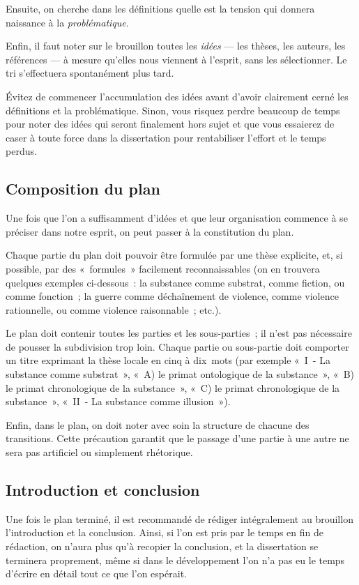 \documentclass[a4paper]{article}
\begin{document}
Ensuite, on cherche dans les définitions quelle est la tension qui
donnera naissance à la \emph{problématique}.

Enfin, il faut noter sur le brouillon toutes les \emph{idées} --- les thèses,
les auteurs, les références --- à mesure qu'elles nous viennent à
l'esprit, sans les sélectionner. Le tri s'effectuera spontanément plus
tard.

Évitez de commencer l'accumulation des idées avant d'avoir clairement
cerné les définitions et la problématique. Sinon, vous risquez perdre
beaucoup de temps pour noter des idées qui seront finalement hors sujet
et que vous essaierez de caser à toute force dans la dissertation pour
rentabiliser l'effort et le temps perdus.
\subsection{Composition du plan}
\label{sec-1-3}


Une fois que l'on a suffisamment d'idées et que leur organisation
commence à se préciser dans notre esprit, on peut passer à la
constitution du plan.

Chaque partie du plan doit pouvoir être formulée par une thèse
explicite, et, si possible, par des « formules » facilement
reconnaissables (on en trouvera quelques exemples ci-dessous : la
substance comme substrat, comme fiction, ou comme fonction ; la guerre
comme déchaînement de violence, comme violence rationnelle, ou comme
violence raisonnable ; etc.).

Le plan doit contenir toutes les parties et les sous-parties ; il n'est
pas nécessaire de pousser la subdivision trop loin. Chaque partie ou
sous-partie doit comporter un titre exprimant la thèse locale en cinq à
dix mots (par exemple « I - La substance comme substrat », « A) le primat
ontologique de la substance », « B) le primat chronologique de la
substance », « C) le primat chronologique de la substance », « II - La
substance comme illusion »).

Enfin, dans le plan, on doit noter avec soin la structure de chacune des
transitions. Cette précaution garantit que le passage d'une partie à une
autre ne sera pas artificiel ou simplement rhétorique.
\subsection{Introduction et conclusion}
\label{sec-1-4}


Une fois le plan terminé, il est recommandé de rédiger intégralement au
brouillon l'introduction et la conclusion. Ainsi, si l'on est pris par
le temps en fin de rédaction, on n'aura plus qu'à recopier la
conclusion, et la dissertation se terminera proprement, même si dans le
développement l'on n'a pas eu le temps d'écrire en détail tout ce que
l'on espérait.
\end{document}
